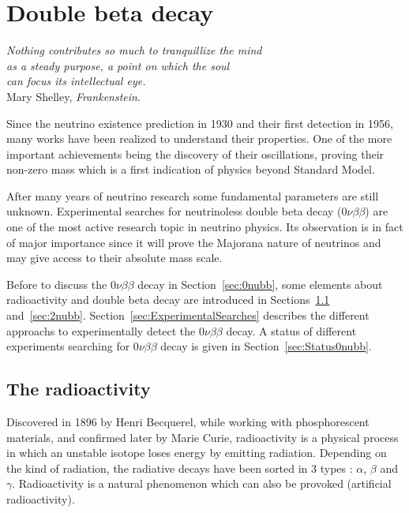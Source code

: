 \documentclass[main.tex]{subfiles}
\begin{document}
\chapter{Double beta decay}
 

\begin{flushright}
\textit{Nothing contributes so much to tranquillize the mind \\
as a steady purpose, a point on which the soul \\
can focus its intellectual eye.}\\
Mary Shelley, \textit{Frankenstein}.
\end{flushright} 


\NI Since the neutrino existence prediction in 1930 and their first detection in 1956, many works have been realized to understand their properties. One of the more important achievements being the discovery of their oscillations, proving their non-zero mass which is a first indication of physics beyond Standard Model. 


\bigskip 


\NI After many years of neutrino research some fundamental parameters are still unknown. Experimental searches for neutrinoless double beta decay (0$\nu\beta\beta$) are one of the most active research topic in neutrino physics. Its observation is in fact of major importance since it will prove the Majorana nature of neutrinos and may give access to their absolute mass scale.


\bigskip


\NI Before to discuss the 0$\nu\beta\beta$ decay in Section~\ref{sec:0nubb}, some elements about radioactivity and double beta decay are introduced in Sections~\ref{sec:radioactivity} and~\ref{sec:2nubb}. Section~\ref{sec:ExperimentalSearches} describes the different approachs to experimentally detect the 0$\nu\beta\beta$ decay. A status of different experiments searching for 0$\nu\beta\beta$ decay is given in Section~\ref{sec:Status0nubb}.
  

\section{The radioactivity}\label{sec:radioactivity}


\NI Discovered in 1896 by Henri Becquerel, while working with phosphorescent materials, and confirmed later by Marie Curie, radioactivity is a physical process in which an unstable isotope loses energy by emitting radiation. Depending on the kind of radiation, the radiative decays have been sorted in 3 types : $\alpha$, $\beta$ and $\gamma$. Radioactivity is a natural phenomenon which can also be provoked (artificial radioactivity).
\end{document}
